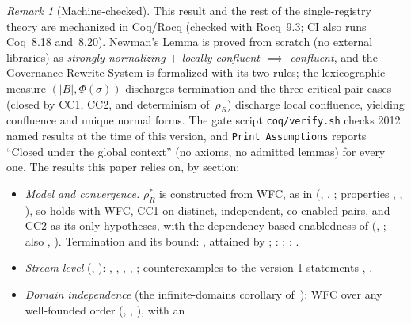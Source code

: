\documentclass[11pt,a4paper]{article}
\theoremstyle{plain}
\theoremstyle{definition}
\theoremstyle{remark}
\newtheorem{remark}[theorem]{Remark}
\renewcommand{\_}{\textunderscore\allowbreak}
\begin{document}
\begin{remark}[Machine-checked]
\label{sec:mechanization}
This result and the rest of the single-registry theory are mechanized in Coq/Rocq
(checked with Rocq~9.3; CI also runs Coq~8.18 and~8.20).  Newman's Lemma is
proved from scratch (no external libraries) as \emph{strongly normalizing
$+$ locally confluent $\implies$ confluent}, and the Governance Rewrite System
is formalized with its two rules; the lexicographic measure
$(|B|, \Phi(\sigma))$ discharges termination and the three critical-pair cases
(closed by CC1, CC2, and determinism of~$\rho_R$) discharge local confluence,
yielding confluence and unique normal forms.  The gate script
\texttt{coq/verify.sh} checks 2012 named results at the time of this version, and \texttt{Print
Assumptions} reports ``Closed under the global context'' (no axioms, no
admitted lemmas) for every one.  The results this paper relies on, by
section:
\begin{itemize}[leftmargin=*,nosep]
\item \emph{Model and convergence.}  $\rho_R^*$ is constructed from WFC, as
  in  (,
  , ; properties
  , , ), so
   holds with WFC, CC1 on distinct, independent,
  co-enabled pairs, and CC2 as its only hypotheses, with the
  dependency-based enabledness of 
  (,
  ; also
  ,
  ).  Termination and its bound:
  , attained by
  ; :
  ; :
  .
\item \emph{Stream level} (, ):
  , ,
  , ,
  ; counterexamples to the version-1 statements
  ,
  .
\item \emph{Domain independence} (the infinite-domains corollary of~\cite{blackwell2026nc}): WFC over any
  well-founded order (,
  , ), with an

\end{itemize}
\end{remark}
\end{document}
